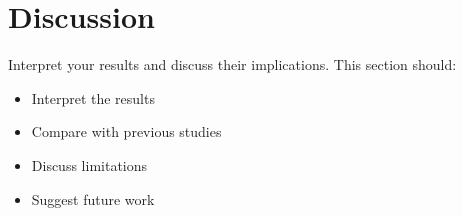 \section{Discussion}
\label{sec:discussion}
Interpret your results and discuss their implications. This section should:
\begin{itemize}
    \item Interpret the results
    \item Compare with previous studies
    \item Discuss limitations
    \item Suggest future work
\end{itemize} 